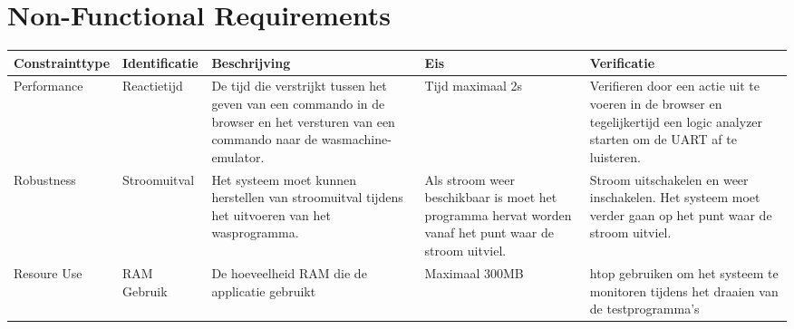 \chapter{Non-Functional Requirements}
\begin{center}
\begin{longtable}{ | p{3cm} | p{2.5cm} | p{2.5cm} | p{2cm} | p{3cm} | }
\hline
\textbf{Constrainttype} & \textbf{Identificatie} & \textbf{Beschrijving} & \textbf{Eis} & \textbf{Verificatie} \\
\hline
Performance & Reactietijd & De tijd die verstrijkt tussen het geven van een commando in de browser en het versturen van een commando naar de wasmachine-emulator. & Tijd maximaal 2s & Verifieren door een actie uit te voeren in de browser en tegelijkertijd een logic analyzer starten om de UART af te luisteren. \\ \hline

Robustness & Stroomuitval & Het systeem moet kunnen herstellen van stroomuitval tijdens het uitvoeren van het wasprogramma. & Als stroom weer beschikbaar is moet het programma hervat worden vanaf het punt waar de stroom uitviel. & Stroom uitschakelen en weer inschakelen. Het systeem moet verder gaan op het punt waar de stroom uitviel. \\ \hline

Resoure Use & RAM Gebruik & De hoeveelheid RAM die de applicatie gebruikt & Maximaal 300MB & htop gebruiken om het systeem te monitoren tijdens het draaien van de testprogramma's \\ \hline
\end{longtable}

\end{center}